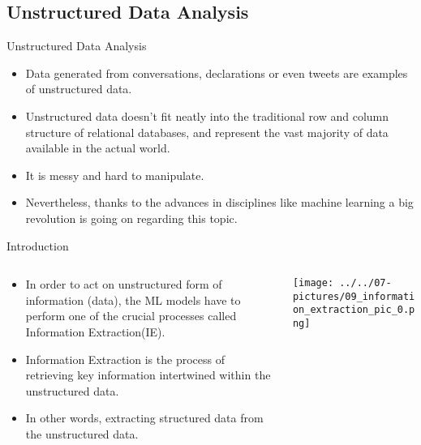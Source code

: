 \documentclass[11pt]{beamer}
\begin{document}
\subsection{Unstructured Data Analysis \\ \scalebox{0.8}{}}
\begin{frame}{Unstructured Data Analysis}
	\begin{itemize}
		\item Data generated from conversations, declarations or even tweets are examples of unstructured data. 
		\item Unstructured data doesn't fit neatly into the traditional row and column structure of relational databases, and represent the vast majority of data available in the actual world. 
		\item It is messy and hard to manipulate. 
		\item Nevertheless, thanks to the advances in disciplines like machine learning a big revolution is going on regarding this topic.
	\end{itemize}
\end{frame}
\begin{frame}{Introduction}
\begin{columns}[T] %
\begin{column}{.48\textwidth}
        \begin{itemize}
		\item In order to act on unstructured form of information (data), the ML models have to perform one of the crucial processes called Information Extraction(IE). 
		\item Information Extraction is the process of retrieving key information intertwined within the unstructured data. 
		\item In other words, extracting structured data from the unstructured data.
        \end{itemize}
\end{column}%
\hfill%
\begin{column}{.48\textwidth}
        \texttt{[image: ../../07-pictures/09\_information\_extraction\_pic\_0.png]}
\end{column}%
\end{columns}
\end{frame}
\end{document}
